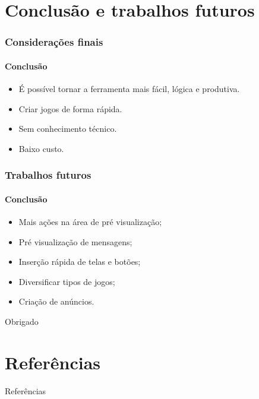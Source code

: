 \documentclass[]{beamer}
\begin{document}
   \section{Conclusão e trabalhos futuros}
   \begin{frame}
      \frametitle{Considerações finais}
      \framesubtitle{Conclusão}
      \begin{itemize}
         \item É possível tornar a ferramenta mais fácil, lógica e produtiva.
         \item Criar jogos de forma rápida.
         \item Sem conhecimento técnico.
         \item Baixo custo.
      \end{itemize}
   \end{frame}
   \begin{frame}
      \frametitle{Trabalhos futuros}
      \framesubtitle{Conclusão}

      \begin{itemize}
         \item Mais ações na área de pré visualização;
         \item Pré visualização de mensagens;
         \item Inserção rápida de telas e botões;
         \item Diversificar tipos de jogos;
         \item Criação de anúncios.
      \end{itemize}
      
   \end{frame}
   \begin{frame}
      \begin{center}
         Obrigado
      \end{center}
   \end{frame}

   \section{Referências}
   \begin{frame}[allowframebreaks]{Referências}
   
   \end{frame}
\end{document}
